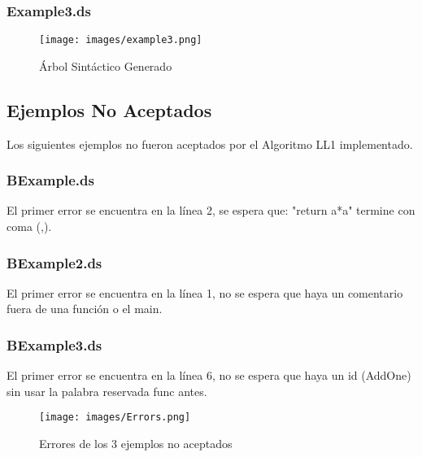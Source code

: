 \documentclass[https://www.overleaf.com/project/63761df255a8a9f4a15c3579
	letterpaper, %
	10pt, %
]{CSUniSchoolLabReport}
\begin{document}
        \subsubsection{Example3.ds}
            

            \begin{figure}[H]
            	\centering
            	\texttt{[image: images/example3.png]}
                \caption{ Árbol Sintáctico Generado }
            \end{figure}

    \subsection{Ejemplos No Aceptados}
    Los siguientes ejemplos no fueron aceptados por el Algoritmo LL1 implementado.
        \subsubsection{BExample.ds}
            El primer error se encuentra en la línea 2, se espera que: "return a*a" termine con coma (,).
            
        \subsubsection{BExample2.ds}
            El primer error se encuentra en la línea 1, no se espera que haya un comentario fuera de una función o el main.
            
        \subsubsection{BExample3.ds}
            El primer error se encuentra en la línea 6, no se espera que haya un id (AddOne) sin usar la palabra reservada func antes.
            

        \begin{figure}[H]
            \centering
            \texttt{[image: images/Errors.png]}
            \caption{ Errores de los 3 ejemplos no aceptados }
        \end{figure}


    
\end{document}
